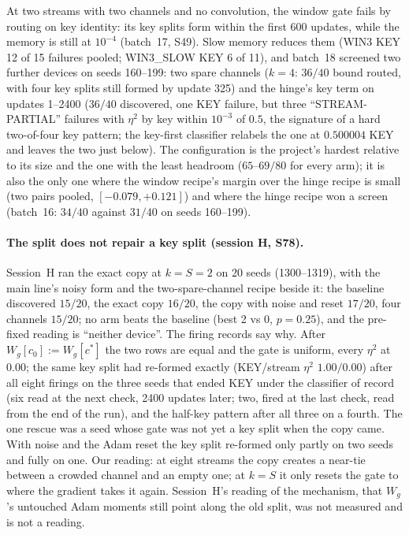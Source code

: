 \documentclass[11pt]{article}
\newcommand{\arm}[1]{\textsf{#1}}
\begin{document}
At two streams with two channels and no convolution, the window gate fails by routing on key identity: its key splits form within the first 600 updates, while the memory is still at $10^{-4}$ (batch~17, S49). Slow memory reduces them (\arm{WIN3} KEY 12 of 15 failures pooled; \arm{WIN3\_SLOW} KEY 6 of 11), and batch~18 screened two further devices on seeds 160--199: two spare channels ($k = 4$: $36/40$ bound routed, with four key splits still formed by update 325) and the hinge's key term on updates 1--2400 ($36/40$ discovered, one KEY failure, but three ``STREAM-PARTIAL'' failures with $\eta^2$ by key within $10^{-3}$ of $0.5$, the signature of a hard two-of-four key pattern; the key-first classifier relabels the one at $0.500004$ KEY and leaves the two just below). The configuration is the project's hardest relative to its size and the one with the least headroom ($65$--$69/80$ for every arm); it is also the only one where the window recipe's margin over the hinge recipe is small (two pairs pooled, $[-0.079, +0.121]$) and where the hinge recipe won a screen (batch~16: $34/40$ against $31/40$ on seeds 160--199).

\paragraph{The split does not repair a key split (session H, S78).} Session~H ran the exact copy at $k = S = 2$ on 20 seeds (1300--1319), with the main line's noisy form and the two-spare-channel recipe beside it: the baseline discovered $15/20$, the exact copy $16/20$, the copy with noise and reset $17/20$, four channels $15/20$; no arm beats the baseline (best 2 vs 0, $p = 0.25$), and the pre-fixed reading is ``neither device''. The firing records say why. After $W_g[c_0] := W_g[c^*]$ the two rows are equal and the gate is uniform, every $\eta^2$ at $0.00$; the same key split had re-formed exactly (KEY/stream $\eta^2$ $1.00/0.00$) after all eight firings on the three seeds that ended KEY under the classifier of record (six read at the next check, 2400 updates later; two, fired at the last check, read from the end of the run), and the half-key pattern after all three on a fourth. The one rescue was a seed whose gate was not yet a key split when the copy came. With noise and the Adam reset the key split re-formed only partly on two seeds and fully on one. Our reading: at eight streams the copy creates a near-tie between a crowded channel and an empty one; at $k = S$ it only resets the gate to where the gradient takes it again. Session~H's reading of the mechanism, that $W_g$'s untouched Adam moments still point along the old split, was not measured and is not a reading.
\end{document}
